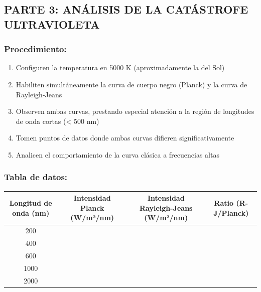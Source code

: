 \documentclass[12pt,a4paper]{article}
\begin{document}
	
	\subsection{PARTE 3: ANÁLISIS DE LA CATÁSTROFE ULTRAVIOLETA}
	
	\subsubsection{Procedimiento:}
	\begin{enumerate}
		\item Configuren la temperatura en 5000 K (aproximadamente la del Sol)
		\item Habiliten simultáneamente la curva de cuerpo negro (Planck) y la curva de Rayleigh-Jeans
		\item Observen ambas curvas, prestando especial atención a la región de longitudes de onda cortas (< 500 nm)
		\item Tomen puntos de datos donde ambas curvas difieren significativamente
		\item Analicen el comportamiento de la curva clásica a frecuencias altas
	\end{enumerate}
	
	\subsubsection{Tabla de datos:}
	
	\begin{center}
		\begin{tabular}{|c|c|c|c|}
			\hline
			\textbf{Longitud de onda (nm)} & \textbf{Intensidad Planck (W/m²/nm)} & \textbf{Intensidad Rayleigh-Jeans (W/m²/nm)} & \textbf{Ratio (R-J/Planck)} \\
			\hline
			200 & & & \\
			\hline
			400 & & & \\
			\hline
			600 & & & \\
			\hline
			1000 & & & \\
			\hline
			2000 & & & \\
			\hline
		\end{tabular}
	\end{center}
	
\end{document}
